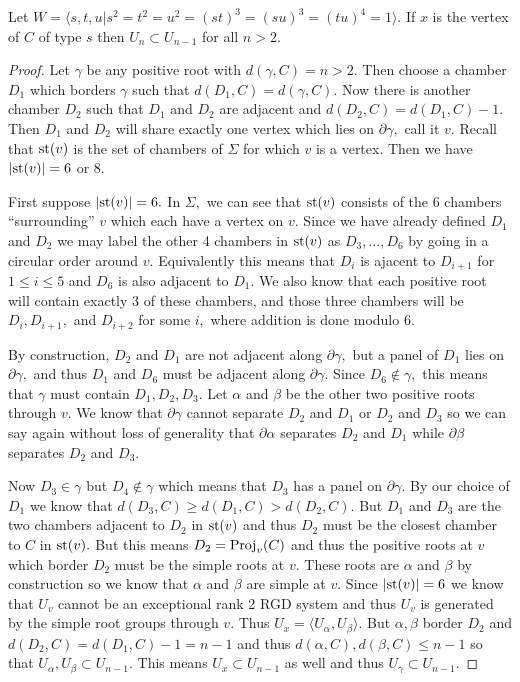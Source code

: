 \documentclass[class=book, crop=false]{standalone}
\begin{document}
\begin{theorem}
	\label{334f2fg}
	Let $W=\langle s,t,u|s^2=t^2=u^2=(st)^3=(su)^3=(tu)^4=1\rangle.$ If $x$ is the vertex of $C$ of type $s$ then $U_n\subset U_{n-1}$ for all $n>2.$
\end{theorem}
\begin{proof}
	Let $\gamma$ be any positive root with $d(\gamma,C)=n>2.$ Then choose a chamber $D_1$ which borders $\gamma$ such that $d(D_1,C)=d(\gamma,C).$ Now there is another chamber $D_2$ such that $D_1$ and $D_2$ are adjacent and $d(D_2,C)=d(D_1,C)-1.$ Then $D_1$ and $D_2$ will share exactly one vertex which lies on $\partial \gamma,$ call it $v.$ Recall that $\mathrm{st}(v)$ is the set of chambers of $\Sigma$ for which $v$ is a vertex. Then we have $|\mathrm{st}(v)|=6$ or $8.$

	First suppose $|\mathrm{st}(v)|=6.$ In $\Sigma,$ we can see that $\mathrm{st}(v)$ consists of the 6 chambers ``surrounding'' $v$ which each have a vertex on $v.$ Since we have already defined $D_1$ and $D_2$ we may label the other 4 chambers in $\mathrm{st}(v)$ as $D_3,\dots,D_6$ by going in a circular order around $v.$ Equivalently this means that $D_i$ is ajacent to $D_{i+1}$ for $1\le i\le 5$ and $D_6$ is also adjacent to $D_1.$ We also know that each positive root will contain exactly 3 of these chambers, and those three chambers will be $D_i,D_{i+1},$ and $D_{i+2}$ for some $i,$ where addition is done modulo 6.

	By construction, $D_2$ and $D_1$ are not adjacent along $\partial \gamma,$ but a panel of $D_1$ lies on $\partial \gamma,$ and thus $D_1$ and $D_6$ must be adjacent along $\partial\gamma.$ Since $D_6\not\in \gamma,$ this means that $\gamma$ must contain $D_1,D_2,D_3.$ Let $\alpha$ and $\beta$ be the other two positive roots through $v.$ We know that $\partial\gamma$ cannot separate $D_2$ and $D_1$ or $D_2$ and $D_3$ so we can say again without loss of generality that $\partial\alpha$ separates $D_2$ and $D_1$ while $\partial\beta$ separates $D_2$ and $D_3.$ 

	Now $D_3\in \gamma$ but $D_4\not\in \gamma$ which means that $D_3$ has a panel on $\partial\gamma.$ By our choice of $D_1$ we know that $d(D_3,C)\ge d(D_1,C)>d(D_2,C).$ But $D_1$ and $D_3$ are the two chambers adjacent to $D_2$ in $\mathrm{st}(v)$ and thus $D_2$ must be the closest chamber to $C$ in $\mathrm{st}(v).$ But this means $D_2=\mathrm{Proj}_v(C)$ and thus the positive roots at $v$ which border $D_2$ must be the simple roots at $v.$ These roots are $\alpha$ and $\beta$ by construction so we know that $\alpha$ and $\beta$ are simple at $v.$ Since $|\mathrm{st}(v)|=6$ we know that $U_v$ cannot be an exceptional rank 2 RGD system and thus $U_v$ is generated by the simple root groups through $v.$ Thus $U_x=\langle U_\alpha,U_\beta\rangle.$ But $\alpha,\beta$ border $D_2$ and $d(D_2,C)=d(D_1,C)-1=n-1$ and thus $d(\alpha,C),d(\beta,C)\le n-1$ so that $U_\alpha,U_\beta\subset U_{n-1}.$ This means $U_x\subset U_{n-1}$ as well and thus $U_\gamma \subset U_{n-1}.$
	

\end{proof}
\end{document}
